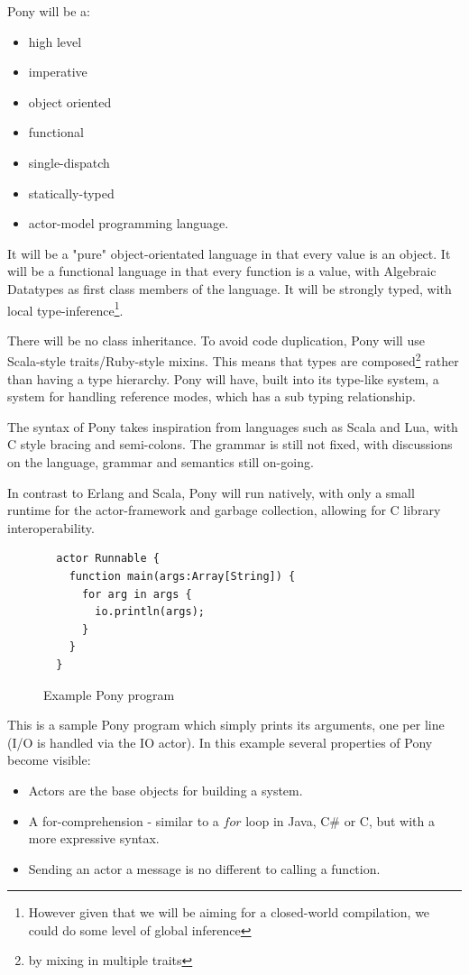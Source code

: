 \documentclass[pdftex,11pt,a4paper]{report}
\begin{document}
Pony will be a:
\begin{itemize}[noitemsep]
\item high level
\item imperative
\item object oriented
\item functional
\item single-dispatch
\item statically-typed
\item actor-model programming language.
\end{itemize}
It will be a "pure" object-orientated language in that every value is an object.
It will be a functional language in that every function is a value, with Algebraic Datatypes as first class members of the language.
It will be strongly typed, with local type-inference\footnote{However given that we will be aiming for a closed-world compilation, we could do some level of global inference}.

There will be no class inheritance.
To avoid code duplication, Pony will use Scala-style traits/Ruby-style mixins.
This means that types are composed\footnote{by mixing in multiple traits} rather than having a type hierarchy.
Pony will have, built into its type-like system, a system for handling reference modes, which has a sub typing relationship.

The syntax of Pony takes inspiration from languages such as Scala and Lua, with C style bracing and semi-colons.
The grammar is still not fixed, with discussions on the language, grammar and semantics still on-going.

In contrast to Erlang and Scala, Pony will run natively, with only a small runtime for the actor-framework and garbage collection, allowing for C library interoperability.

\begin{figure}[H]
\begin{verbatim}
  actor Runnable {
    function main(args:Array[String]) {
      for arg in args {
      	io.println(args);
      }
    }
  }
\end{verbatim}
\caption{Example Pony program}
\label{fig:simple}
\end{figure}

This is a sample Pony program which simply prints its arguments, one per line (I/O is handled via the IO actor).
In this example several properties of Pony become visible:
\begin{itemize}
\item Actors are the base objects for building a system.
\item A for-comprehension - similar to a $for$ loop in Java, C\# or C, but with
      a more expressive syntax.
\item Sending an actor a message is no different to calling a function.
\end{itemize}
\end{document}
